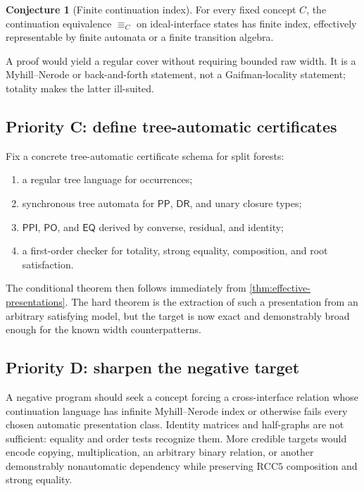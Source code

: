 \documentclass[11pt]{article}
\theoremstyle{definition}
\newtheorem{conjecture}[theorem]{Conjecture}
\theoremstyle{remark}
\newcommand{\RCC}{\mathrm{RCC5}}
\newcommand{\EQ}{\mathsf{EQ}}
\newcommand{\PP}{\mathsf{PP}}
\newcommand{\PPI}{\mathsf{PPI}}
\newcommand{\PO}{\mathsf{PO}}
\newcommand{\DR}{\mathsf{DR}}
\begin{document}
\begin{conjecture}[Finite continuation index]\label{conj:index}
For every fixed concept $C$, the continuation equivalence $\equiv_C$ on ideal-interface states has finite index, effectively representable by finite automata or a finite transition algebra.
\end{conjecture}

A proof would yield a regular cover without requiring bounded raw width.  It is a Myhill--Nerode or back-and-forth statement, not a Gaifman-locality statement; totality makes the latter ill-suited.

\subsection{Priority C: define tree-automatic certificates}

Fix a concrete tree-automatic certificate schema for split forests:
\begin{enumerate}[label=C\arabic*.,leftmargin=3em]
\item a regular tree language for occurrences;
\item synchronous tree automata for $\PP$, $\DR$, and unary closure types;
\item $\PPI$, $\PO$, and $\EQ$ derived by converse, residual, and identity;
\item a first-order checker for totality, strong equality, composition, and root satisfaction.
\end{enumerate}
The conditional theorem then follows immediately from \cref{thm:effective-presentations}.  The hard theorem is the extraction of such a presentation from an arbitrary satisfying model, but the target is now exact and demonstrably broad enough for the known width counterpatterns.

\subsection{Priority D: sharpen the negative target}

A negative program should seek a concept forcing a cross-interface relation whose continuation language has infinite Myhill--Nerode index or otherwise fails every chosen automatic presentation class.  Identity matrices and half-graphs are not sufficient: equality and order tests recognize them.  More credible targets would encode copying, multiplication, an arbitrary binary relation, or another demonstrably nonautomatic dependency while preserving $\RCC$ composition and strong equality.
\end{document}
